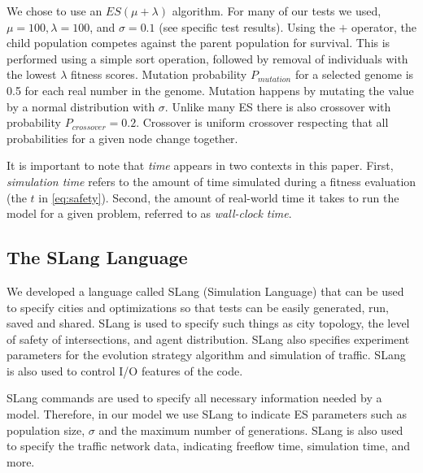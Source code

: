 \documentclass{sig-alternate-05-2015}
\begin{document}
We chose to use an $ES(\mu + \lambda)$ algorithm.  For many of our
tests we used, $\mu = 100, \lambda = 100$, and $\sigma = 0.1$ (see
specific test results).  Using the $+$ operator, the child population
competes against the parent population for survival.  This is
performed using a simple sort operation, followed by removal of
individuals with the lowest $\lambda$ fitness scores.  Mutation
probability $P_{mutation}$ for a selected genome is 0.5 for each real number
in the genome.  Mutation happens by mutating the value by a normal
distribution with $\sigma$.  Unlike many ES there is also crossover
with probability $P_{crossover}=0.2$.  Crossover is uniform crossover
respecting that all probabilities for a given node change together.

It is important to note that \emph{time} appears in two contexts in this
paper.  First, \emph{simulation time} refers to the amount of time
simulated during a fitness evaluation (the $t$ in \ref{eq:safety}). Second,
the amount of real-world time it takes to run the model for a given problem,
referred to as \emph{wall-clock time}.

\subsection{The SLang Language}
We developed a language called SLang (Simulation Language) that can be
used to specify cities and optimizations so that tests can be easily
generated, run, saved and shared.  SLang is used to specify such
things as city topology, the level of safety of intersections, and
agent distribution.
SLang also specifies experiment parameters for the evolution
strategy algorithm and simulation of traffic.  SLang is also used to
control I/O features of the code.

SLang commands are used to specify all necessary information needed
by a model.  Therefore, in our model we use SLang to indicate ES
parameters such as population size, $\sigma$ and the maximum
number of generations.  SLang is also used to specify the traffic
network data, indicating freeflow time, simulation time, and more.
\end{document}
